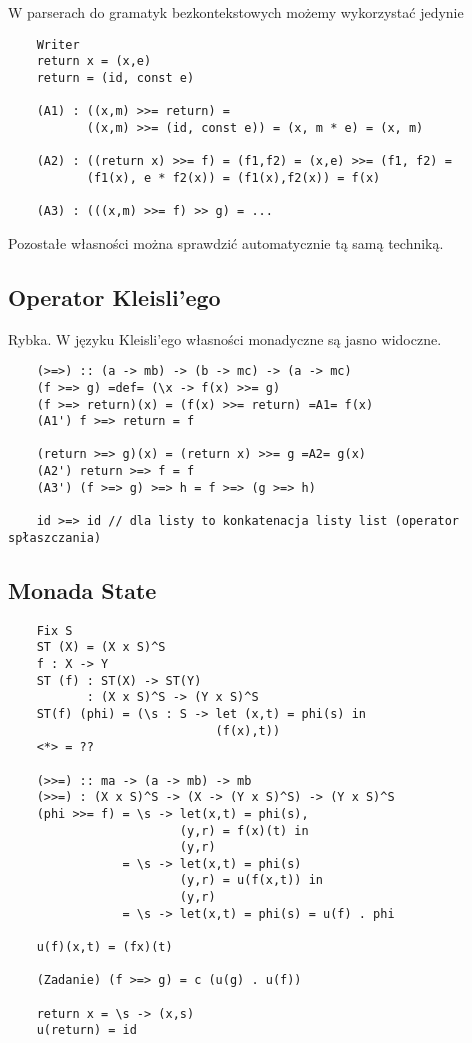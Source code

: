 \documentclass{article}
\begin{document}
W parserach do gramatyk bezkontekstowych możemy wykorzystać jedynie \text{<*>}

\begin{verbatim}
    Writer
    return x = (x,e)
    return = (id, const e)

    (A1) : ((x,m) >>= return) =
           ((x,m) >>= (id, const e)) = (x, m * e) = (x, m)

    (A2) : ((return x) >>= f) = (f1,f2) = (x,e) >>= (f1, f2) =
           (f1(x), e * f2(x)) = (f1(x),f2(x)) = f(x)

    (A3) : (((x,m) >>= f) >> g) = ...
\end{verbatim}

Pozostałe własności można sprawdzić automatycznie tą samą techniką.

\subsection{Operator Kleisli'ego}

Rybka. W języku Kleisli'ego własności monadyczne są jasno widoczne.

\begin{verbatim}
    (>=>) :: (a -> mb) -> (b -> mc) -> (a -> mc)
    (f >=> g) =def= (\x -> f(x) >>= g)
    (f >=> return)(x) = (f(x) >>= return) =A1= f(x)
    (A1') f >=> return = f

    (return >=> g)(x) = (return x) >>= g =A2= g(x)
    (A2') return >=> f = f
    (A3') (f >=> g) >=> h = f >=> (g >=> h)

    id >=> id // dla listy to konkatenacja listy list (operator spłaszczania)
\end{verbatim}

\subsection{Monada State}

\begin{verbatim}
    Fix S 
    ST (X) = (X x S)^S
    f : X -> Y
    ST (f) : ST(X) -> ST(Y)
           : (X x S)^S -> (Y x S)^S
    ST(f) (phi) = (\s : S -> let (x,t) = phi(s) in
                             (f(x),t))
    <*> = ??

    (>>=) :: ma -> (a -> mb) -> mb
    (>>=) : (X x S)^S -> (X -> (Y x S)^S) -> (Y x S)^S
    (phi >>= f) = \s -> let(x,t) = phi(s),
                        (y,r) = f(x)(t) in
                        (y,r)
                = \s -> let(x,t) = phi(s)
                        (y,r) = u(f(x,t)) in
                        (y,r)
                = \s -> let(x,t) = phi(s) = u(f) . phi
                    
    u(f)(x,t) = (fx)(t)

    (Zadanie) (f >=> g) = c (u(g) . u(f))

    return x = \s -> (x,s)
    u(return) = id
\end{verbatim}
\end{document}
